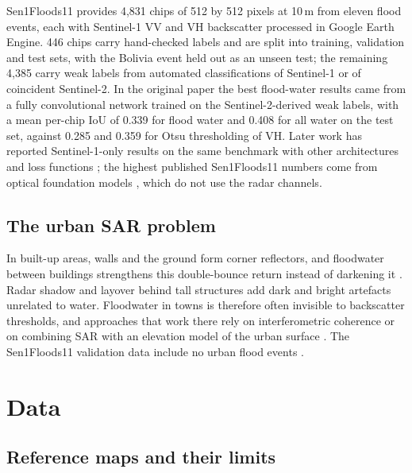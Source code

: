 \documentclass[11pt]{article}
\begin{document}
Sen1Floods11 \cite{bonafilia2020} provides 4,831 chips of 512 by 512 pixels at
10\,m from eleven flood events, each with Sentinel-1 VV and VH backscatter
processed in Google Earth Engine. 446 chips carry hand-checked labels and are
split into training, validation and test sets, with the Bolivia event held out
as an unseen test; the remaining 4,385 carry weak labels from automated
classifications of Sentinel-1 or of coincident Sentinel-2. In the original
paper the best flood-water results came from a fully convolutional network
trained on the Sentinel-2-derived weak labels, with a mean per-chip IoU of
0.339 for flood water and 0.408 for all water on the test set, against 0.285
and 0.359 for Otsu thresholding of VH. Later work has reported Sentinel-1-only
results on the same benchmark with other architectures and loss functions
\cite{bai2021,konapala2021}; the highest published Sen1Floods11 numbers come
from optical foundation models \cite{jakubik2023,szwarcman2024}, which do not
use the radar channels.

\subsection{The urban SAR problem}

In built-up areas, walls and the ground form corner reflectors, and floodwater
between buildings strengthens this double-bounce return instead of darkening
it \cite{mason2012,mason2014}. Radar shadow and layover behind tall structures
add dark and bright artefacts unrelated to water. Floodwater in towns is
therefore often invisible to backscatter thresholds, and approaches that work
there rely on interferometric coherence or on combining SAR with an elevation
model of the urban surface \cite{mason2021}. The Sen1Floods11 validation data
include no urban flood events \cite{bonafilia2020}.

\section{Data}
\label{sec:data}

\subsection{Reference maps and their limits}
\end{document}
